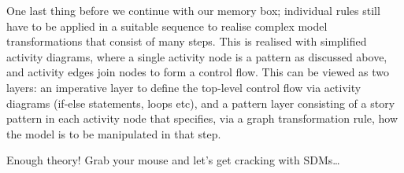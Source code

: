 \clearpage 

One last thing before we continue with our memory box; individual rules still
have to be applied in a suitable sequence to realise complex model
transformations that consist of many steps.  This is realised with simplified
activity diagrams, where a single activity node is a pattern as discussed above,
and activity edges join nodes to form a control flow.   This can be viewed as
two layers:  an imperative layer to define the top-level control flow via
activity diagrams (if-else statements, loops etc), and a pattern layer
consisting of a story pattern in each activity node that specifies, via a graph
transformation rule, how the model is to be manipulated in that step.         

Enough theory! Grab your mouse and let's get cracking with SDMs\ldots